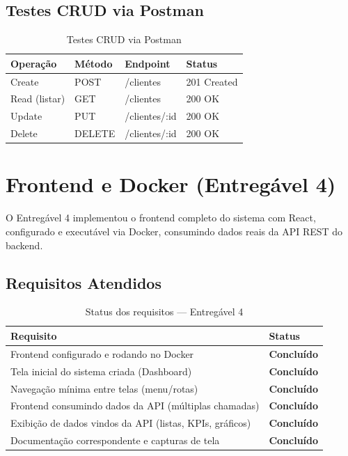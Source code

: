 \documentclass[12pt, a4paper]{article}
\newcommand{\thead}[1]{\cellcolor{tableheader}\color{white}\bfseries #1}
\newcommand{\talt}{\rowcolor{tablerowalt}}
\newcommand{\tok}{\textcolor{successgreen}{\textbf{Concluído}}}
\begin{document}
\subsection{Testes CRUD via Postman}

\begin{table}[H]
\centering
\begin{tabular}{|l|l|l|l|}
\hline
\thead{Operação} & \thead{Método} & \thead{Endpoint} & \thead{Status} \\
\hline
Create       & POST   & /clientes     & 201 Created \\
\talt Read (listar) & GET    & /clientes     & 200 OK \\
Update       & PUT    & /clientes/:id & 200 OK \\
\talt Delete       & DELETE & /clientes/:id & 200 OK \\
\hline
\end{tabular}
\caption{Testes CRUD via Postman}
\end{table}

\section{Frontend e Docker (Entregável 4)}

O Entregável 4 implementou o frontend completo do sistema com React, configurado e executável via Docker, consumindo dados reais da API REST do backend.

\subsection{Requisitos Atendidos}

\begin{table}[H]
\centering
\begin{tabularx}{\textwidth}{|X|l|}
\hline
\thead{Requisito} & \thead{Status} \\
\hline
Frontend configurado e rodando no Docker & \tok \\
\talt Tela inicial do sistema criada (Dashboard) & \tok \\
Navegação mínima entre telas (menu/rotas) & \tok \\
\talt Frontend consumindo dados da API (múltiplas chamadas) & \tok \\
Exibição de dados vindos da API (listas, KPIs, gráficos) & \tok \\
\talt Documentação correspondente e capturas de tela & \tok \\
\hline
\end{tabularx}
\caption{Status dos requisitos — Entregável 4}
\end{table}
\end{document}

